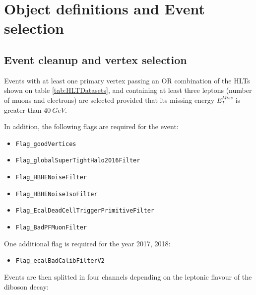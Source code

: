 \section{Object definitions and Event selection}

\subsection{Event cleanup and vertex selection}

Events with at least one primary vertex passing an OR combination
of the HLTs shown on table \ref{tab:HLTDatasets}, and containing at least three
leptons (number of muons and electrons) are selected provided that its
missing energy $E_T^{Miss}$ is greater than $40~GeV$.

In addition, the following flags are required for the event:

\begin{itemize}
  \item \verb|Flag_goodVertices|
  \item \verb|Flag_globalSuperTightHalo2016Filter|
  \item \verb|Flag_HBHENoiseFilter|
  \item \verb|Flag_HBHENoiseIsoFilter|
  \item \verb|Flag_EcalDeadCellTriggerPrimitiveFilter|
  \item \verb|Flag_BadPFMuonFilter|
\end{itemize}

One additional flag is required for the year 2017, 2018:

\begin{itemize}
\item \verb|Flag_ecalBadCalibFilterV2|
\end{itemize}

Events are then splitted in four channels depending on the leptonic flavour of the
diboson decay:

